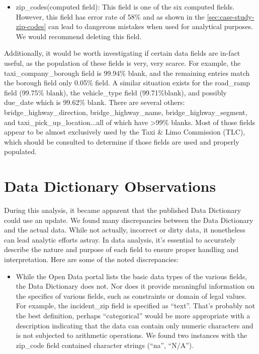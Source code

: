 \documentclass[12pt, titlepage]{article}
\begin{document}
{\begin{itemize}
		    \item zip\_codes(computed field):  This field is one of the six computed fields.  However, this field has error rate of
		    58\% and as shown in the \ref{sec:case-study-zip-codes} can lead to dangerous mistakes when used for analytical purposes.
		    We would recommend deleting this field.
	\end{itemize}
 	
Additionally, it would be worth investigating if certain data fields are in-fact useful, as the population of these fields is very, very 
scarce. For example, the taxi\_company\_borough field is 99.94\% blank, and the remaining entries match the borough field only
0.05\% field. A similar situation exists for the road\_ramp field (99.75\% blank), the vehicle\_type field (99.71\%blank), and possibly 
due\_date which is 99.62\% blank. There are several others: bridge\_highway\_direction, bridge\_highway\_name,
bridge\_highway\_segment, and taxi\_pick\_up\_location...all of which have \textgreater99\% blanks. Most of those fields appear to be 
almost exclusively used by the Taxi \& Limo Commission (TLC), which should be consulted to 
determine if those fields are used and properly populated.   



\section{Data Dictionary Observations} \label{sec:datadictionay}
During this analysis, it became apparent that the published Data Dictionary could use an update. We found many discrepancies between
the Data Dictionary and the actual data. While not actually, incorrect or dirty data, it nonetheless can lead analytic efforts astray.
In data analysis, it's essential to accurately describe the nature and purpose of each field to ensure proper handling and interpretation. 
Here are some of the noted discrepancies:  

\begin{itemize}
	\item While the Open Data portal lists the basic data types of the various fields, the Data Dictionary does not. Nor
	does it provide meaningful information on the specifics of various fields, such as constraints or domain of legal values.
	For example, the incident\_zip field is specified as ``text''. That's probably not the best definition, perhaps
	``categorical'' would be more appropriate with a description indicating that the data can contain only numeric characters
	and is not subjected to arithmetic operations. We found two instances with the zip\_code field contained character strings (``na'', ``N/A''). 


\end{itemize}}
\end{document}
